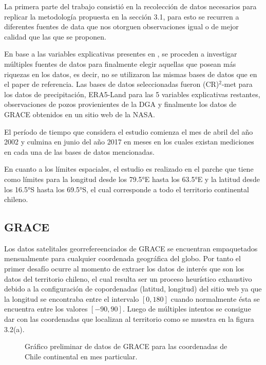 La primera parte del trabajo consistió en la recolección de datos necesarios para replicar la metodología
propuesta en la sección 3.1, para esto se recurren a diferentes fuentes de data que nos otorguen observaciones igual
o de mejor calidad que las que se proponen.

En base a las variables explicativas presentes en \cite{11}, se proceden a investigar múltiples fuentes de datos para finalmente
elegir aquellas que posean más riquezas en los datos, es decir, no se utilizaron las mismas bases de datos que en el paper de referencia. 
Las bases de datos seleccionadas fueron (CR)$^2$-met para los datos de precipitación, ERA5-Land para las 5 variables explicativas restantes,
observaciones de pozos provienientes de la DGA y finalmente los datos de GRACE obtenidos en un sitio web de la NASA.

El período de tiempo que considera el estudio comienza el mes de abril del año 2002 y culmina en junio del año 2017 en meses en los cuales existan mediciones en cada una
de las bases de datos mencionadas.

En cuanto a los límites espaciales, el estudio es realizado en el parche que tiene como límites para la longitud desde los 79.5°E hasta los 63.5°E y la latitud desde los 16.5°S hasta los
69.5°S, el cual corresponde a todo el territorio continental chileno.

    \subsection{GRACE}
    Los datos satelitales georrefereenciados de GRACE se encuentran empaquetados mensualmente
    para cualquier coordenada geográfica del globo. Por tanto el primer desafío ocurre al momento de extraer los datos de interés que son los datos 
    del territorio chileno, el cual resulta ser un proceso heurístico exhaustivo debido a la configuración de copordenadas (latitud, longitud) del sitio web
    ya que la longitud se encontraba entre el intervalo $[0,180]$ cuando normalmente ésta se encuentra entre los valores $[-90,90]$. Luego de múltiples intentos
    se consigue dar con las coordenadas que localizan al territorio como se muestra en la figura 3.2(a).
    
    \begin{figure}[ht]
        \centering
              \goodgap
              \vskip -0.1in
        \caption[Rutina para extracción de datos GRACE]{Gráfico preliminar de datos de GRACE para las coordenadas de Chile continental en mes particular.}
        \label{logo}
    \end{figure}

